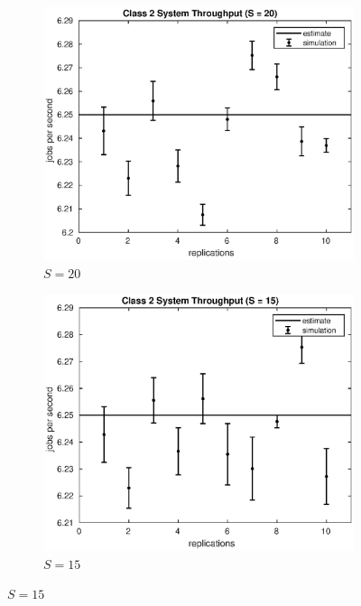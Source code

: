 %
%

\begin{figure}[!h]
\centering
%
\begin{subfigure}[t]{0.49\textwidth}
\includegraphics[width=\textwidth]{figures/simul/20_500K_x2}
\caption{$S = 20$}
\label{20_x2}
\end{subfigure}
%
\begin{subfigure}[t]{0.49\textwidth}
\includegraphics[width=\textwidth]{figures/simul/15_500K_x2}
\caption{$S = 15$}
\label{15_x2}
\end{subfigure}

\end{figure}
